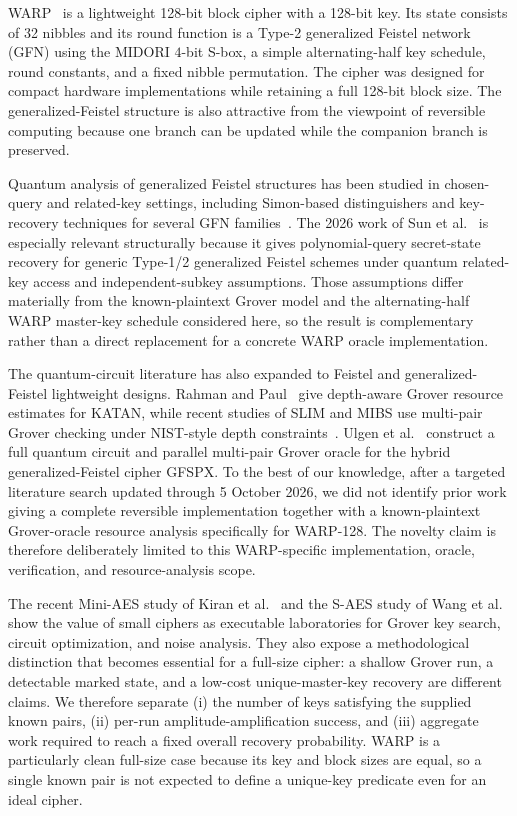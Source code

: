 \documentclass[10pt,a4paper]{article}
\begin{document}
WARP~\cite{WARP2020} is a lightweight 128-bit block cipher with a 128-bit key. Its state consists of 32 nibbles and its round function is a Type-2 generalized Feistel network (GFN) using the MIDORI $4$-bit S-box, a simple alternating-half key schedule, round constants, and a fixed nibble permutation. The cipher was designed for compact hardware implementations while retaining a full 128-bit block size. The generalized-Feistel structure is also attractive from the viewpoint of reversible computing because one branch can be updated while the companion branch is preserved.

Quantum analysis of generalized Feistel structures has been studied in chosen-query and related-key settings, including Simon-based distinguishers and key-recovery techniques for several GFN families~\cite{Dong2019,Hodzic2022,Sun2023,Sun2026}. The 2026 work of Sun et al.~\cite{Sun2026} is especially relevant structurally because it gives polynomial-query secret-state recovery for generic Type-1/2 generalized Feistel schemes under quantum related-key access and independent-subkey assumptions. Those assumptions differ materially from the known-plaintext Grover model and the alternating-half WARP master-key schedule considered here, so the result is complementary rather than a direct replacement for a concrete WARP oracle implementation.

The quantum-circuit literature has also expanded to Feistel and generalized-Feistel lightweight designs. Rahman and Paul~\cite{Rahman2022} give depth-aware Grover resource estimates for KATAN, while recent studies of SLIM and MIBS use multi-pair Grover checking under NIST-style depth constraints~\cite{SLIM2025,MIBS2026}. Ulgen et al.~\cite{Ulgen2026} construct a full quantum circuit and parallel multi-pair Grover oracle for the hybrid generalized-Feistel cipher GFSPX. To the best of our knowledge, after a targeted literature search updated through 5 October 2026, we did not identify prior work giving a complete reversible implementation together with a known-plaintext Grover-oracle resource analysis specifically for WARP-128. The novelty claim is therefore deliberately limited to this WARP-specific implementation, oracle, verification, and resource-analysis scope.

The recent Mini-AES study of Kiran et al.~\cite{Kiran2026} and the S-AES study of Wang et al.~\cite{Wang2025} show the value of small ciphers as executable laboratories for Grover key search, circuit optimization, and noise analysis.  They also expose a methodological distinction that becomes essential for a full-size cipher: a shallow Grover run, a detectable marked state, and a low-cost unique-master-key recovery are different claims.  We therefore separate (i) the number of keys satisfying the supplied known pairs, (ii) per-run amplitude-amplification success, and (iii) aggregate work required to reach a fixed overall recovery probability.  WARP is a particularly clean full-size case because its key and block sizes are equal, so a single known pair is not expected to define a unique-key predicate even for an ideal cipher.
\end{document}
